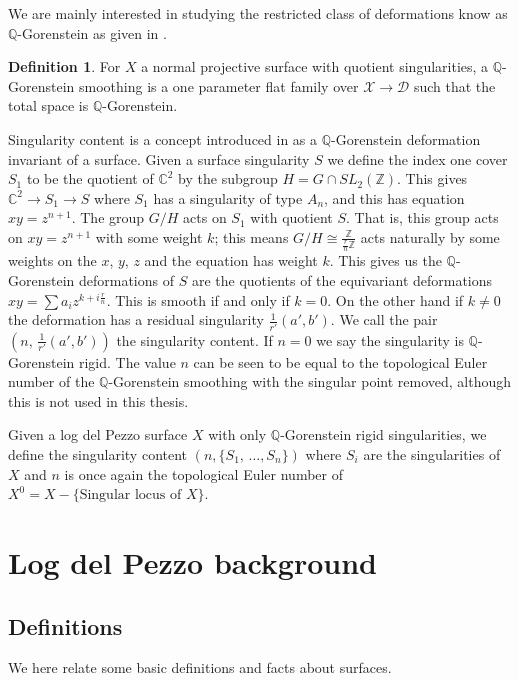 \documentclass[12pt,a4paper]{book}      %
\theoremstyle{definition}
\newtheorem{dfn}[thm]{Definition}
\newcommand{\mb}[1]{\mathbb{#1}}
\newcommand{\ra}{\rightarrow}
\begin{document}
We are mainly interested in studying the restricted class of deformations know as $\mb{Q}$-Gorenstein as given in \cite{Kollar-SB}. 
\begin{dfn}
For $X$ a normal projective surface with quotient singularities, a $\mb{Q}$-Gorenstein smoothing is a one parameter flat family over $\mathcal{X} \ra \mathcal{D}$ such that the total space is $\mb{Q}$-Gorenstein.
\end{dfn}
Singularity content is a concept introduced in \cite{SingContent} as a $\mb{Q}$-Gorenstein deformation invariant of a surface. Given a surface singularity $S$ we define the index one cover $S_1$ to be the quotient of $\mb{C}^2$  by the subgroup $H = G \cap SL_2(\mb{Z})$. This gives $\mb{C}^2 \ra S_1 \ra S$ where $S_1$ has a singularity of type $A_n$, and this has equation $xy = z^{n+1}$. The group $G/H$ acts on $S_1$ with quotient $S$. That is, this group acts on $xy = z^{n+1}$ with some weight $k$; this means $G/H \cong \frac{\mb{Z}}{\frac{r}{n}\mb{Z}}$ acts naturally by  some weights on the $x$, $y$, $z$ and the equation has weight $k$. This gives us the $\mb{Q}$-Gorenstein deformations  of $S$ are  the quotients of the equivariant deformations $xy = \sum a_i z^{k + i\frac{r}{n}}$. This is smooth if and only if $k=0$. On the other hand if $k\neq 0$ the deformation has a residual singularity $\frac{1}{r'}(a', b')$. We call the pair $(n, \, \frac{1}{r'}(a', b')) $ the singularity content. If $n=0$ we say the singularity is $\mb{Q}$-Gorenstein rigid. The value $n$ can be seen to be equal to the topological Euler number of the $\mb{Q}$-Gorenstein smoothing with the singular point removed, although this is not used in this thesis.


Given a log del Pezzo surface $X$ with only $\mb{Q}$-Gorenstein rigid singularities, we define the singularity content $(n, \{S_1, \, \dots, S_n\})$ where $S_i$ are the singularities of $X$ and $n$ is once again the topological Euler number of $X^0 = X - \{\text{Singular locus of } X\}$. 

\section{Log del Pezzo background}

\subsection{Definitions}
We here relate some basic definitions and facts about surfaces.
\end{document}
